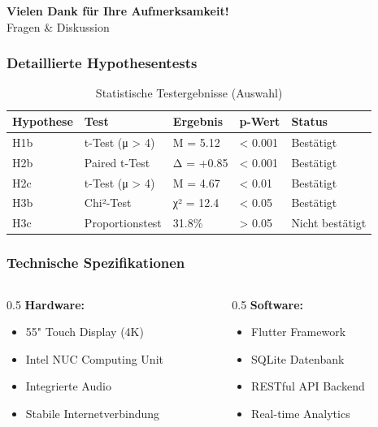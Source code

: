 \documentclass[aspectratio=169,t,xcolor=dvipsnames]{beamer}
\newcommand{\highlight}[1]{\textcolor{LMUBlue}{\textbf{#1}}}
\begin{document}
\begin{frame}
\begin{frame}
\vspace{2em}
\begin{center}
\Large \textcolor{LMUBlue}{\textbf{Vielen Dank für Ihre Aufmerksamkeit!}}\\
\vspace{0.5em}
\large Fragen \& Diskussion
\end{center}
\end{frame}

\appendix

\begin{frame}
\frametitle{Detaillierte Hypothesentests}
\tiny
\begin{table}
\centering
\begin{tabular}{p{2cm}p{3cm}p{2cm}p{1.5cm}p{2cm}}
\toprule
\textbf{Hypothese} & \textbf{Test} & \textbf{Ergebnis} & \textbf{p-Wert} & \textbf{Status} \\
\midrule
H1b & t-Test (μ > 4) & M = 5.12 & < 0.001 & Bestätigt \\
H2b & Paired t-Test & Δ = +0.85 & < 0.001 & Bestätigt \\
H2c & t-Test (μ > 4) & M = 4.67 & < 0.01 & Bestätigt \\
H3b & Chi²-Test & χ² = 12.4 & < 0.05 & Bestätigt \\
H3c & Proportionstest & 31.8\% & > 0.05 & Nicht bestätigt \\
\bottomrule
\end{tabular}
\caption{Statistische Testergebnisse (Auswahl)}
\end{table}
\end{frame}

\begin{frame}
\frametitle{Technische Spezifikationen}
\begin{columns}[T]
\begin{column}{0.5\textwidth}
\highlight{Hardware:}
\begin{itemize}
\item 55" Touch Display (4K)
\item Intel NUC Computing Unit
\item Integrierte Audio
\item Stabile Internetverbindung
\end{itemize}
\end{column}
\begin{column}{0.5\textwidth}
\highlight{Software:}
\begin{itemize}
\item Flutter Framework
\item SQLite Datenbank
\item RESTful API Backend
\item Real-time Analytics
\end{itemize}
\end{column}
\end{columns}


\end{frame}
\end{frame}
\end{document}

